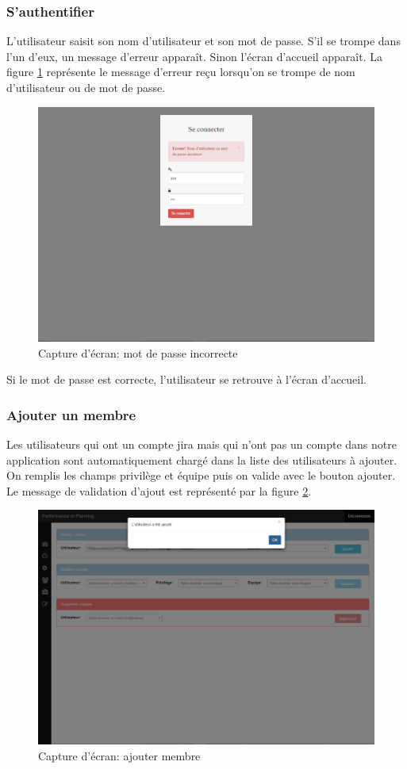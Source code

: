 \subsubsection{S'authentifier}
L'utilisateur saisit son nom d'utilisateur et son mot de passe. S'il se trompe dans l'un d'eux, un message d'erreur apparaît. Sinon l'écran d'accueil apparaît.
La figure \ref{code83} représente le message d'erreur reçu lorsqu'on se trompe de nom d'utilisateur ou de mot de passe.
\begin{figure}[H]
  \centering
 \includegraphics[scale=0.4]{figures/printscreen_app/1_1.PNG}
 \caption{Capture d'écran: mot de passe incorrecte}
 \label{code83}
\end{figure}
Si le mot de passe est correcte, l'utilisateur se retrouve à l'écran d'accueil.
\subsubsection{Ajouter un membre}
Les utilisateurs qui ont un compte jira mais qui n'ont pas un compte dans notre application sont automatiquement chargé dans la liste des utilisateurs à ajouter. On remplis les champs privilège et équipe puis on valide avec le bouton ajouter. Le message de validation d'ajout est représenté par la figure \ref{code84}.
\begin{figure}[H]
  \centering
 \includegraphics[scale=0.4]{figures/printscreen_app/2_2.PNG}
 \caption{Capture d'écran: ajouter membre}
 \label{code84}
\end{figure}
